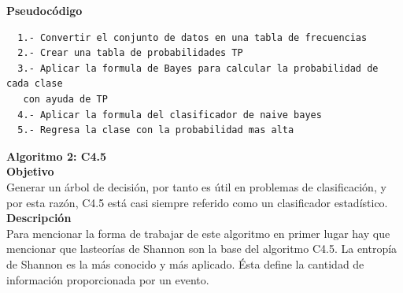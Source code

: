 \documentclass{article}
\begin{document}
{\bf Pseudocódigo}
\begin{verbatim}
  1.- Convertir el conjunto de datos en una tabla de frecuencias
  2.- Crear una tabla de probabilidades TP
  3.- Aplicar la formula de Bayes para calcular la probabilidad de cada clase
   con ayuda de TP
  4.- Aplicar la formula del clasificador de naive bayes
  5.- Regresa la clase con la probabilidad mas alta
\end{verbatim}

{\bf Algoritmo 2: C4.5}\\
{\bf Objetivo}\\
Generar un árbol de decisión, por tanto es útil en problemas de clasificación, y por esta razón, C4.5 está casi siempre referido como un clasificador estadístico.\\
 {\bf Descripción}\\
 Para mencionar la forma de trabajar de este algoritmo en primer lugar hay que mencionar que lasteorías de Shannon son la base del algoritmo C4.5. La entropía de Shannon es la más conocido y más aplicado. Ésta define la cantidad de información proporcionada por un evento.\\
\end{document}
